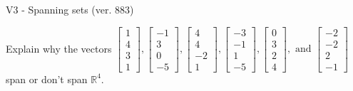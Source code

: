 \begin{exercise}
  \begin{exerciseTitle}V3 - Spanning sets (ver. 883)\end{exerciseTitle}
  \begin{exerciseStatement}
    Explain why the vectors \(\left[\begin{array}{r}
1 \\
4 \\
3 \\
1
\end{array}\right] , \left[\begin{array}{r}
-1 \\
3 \\
0 \\
-5
\end{array}\right] , \left[\begin{array}{r}
4 \\
4 \\
-2 \\
1
\end{array}\right] , \left[\begin{array}{r}
-3 \\
-1 \\
1 \\
-5
\end{array}\right] , \left[\begin{array}{r}
0 \\
3 \\
2 \\
4
\end{array}\right] , \text{ and } \left[\begin{array}{r}
-2 \\
-2 \\
2 \\
-1
\end{array}\right]\) span or don't span \(\mathbb{R}^4\). 
	



\end{exerciseStatement}
\end{exercise}
